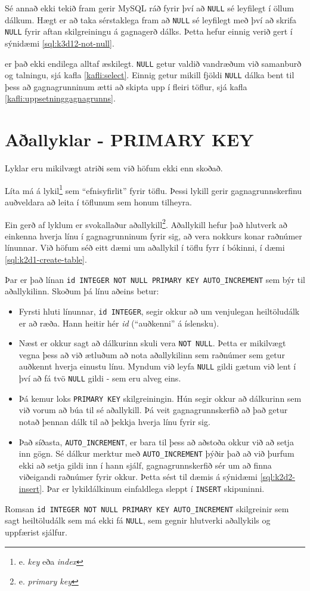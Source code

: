 Sé annað ekki tekið fram gerir MySQL ráð fyrir því að \verb|NULL| sé leyfilegt í öllum dálkum. Hægt er að taka sérstaklega fram að \verb|NULL| sé leyfilegt með því að skrifa \verb|NULL| fyrir aftan skilgreiningu á gagnagerð dálks. Þetta hefur einnig verið gert í sýnidæmi \ref{sql:k3d12-not-null}.

 er það ekki endilega alltaf æskilegt. \verb|NULL| getur valdið vandræðum við samanburð og talningu, sjá kafla \ref{kafli:select}. Einnig getur mikill fjöldi \verb|NULL| dálka bent til þess að gagnagrunninum ætti að skipta upp í fleiri töflur, sjá kafla \ref{kafli:uppsetninggagnagrunns}.

\section{Aðallyklar - PRIMARY KEY} %
\label{undirkafli:adallyklar-kynning}
Lyklar eru mikilvægt atriði sem við höfum ekki enn skoðað.

Líta má á lykil\footnote{e. \emph{key} eða \emph{index}} sem ``efnisyfirlit'' fyrir töflu. Þessi lykill gerir gagnagrunnskerfinu auðveldara að leita í töflunum sem honum tilheyra.

Ein gerð af lyklum er svokallaður aðallykill\footnote{e. \emph{primary key}}. Aðallykill hefur það hlutverk að einkenna hverja línu í gagnagrunninum fyrir sig, að vera nokkurs konar raðnúmer línunnar. Við höfum séð eitt dæmi um aðallykil í töflu fyrr í bókinni, í dæmi \ref{sql:k2d1-create-table}.

Þar er það línan \verb|id INTEGER NOT NULL PRIMARY KEY AUTO_INCREMENT| sem býr til aðallykilinn. Skoðum þá línu aðeins betur:

\begin{itemize}
 \item Fyrsti hluti línunnar, \verb|id INTEGER|, segir okkur að um venjulegan heiltöludálk er að ræða. Hann heitir hér \emph{id} (``auðkenni'' á íslensku). 
 \item Næst er okkur sagt að dálkurinn skuli vera \verb|NOT NULL|. Þetta er mikilvægt vegna þess að við ætluðum að nota aðallykilinn sem raðnúmer sem getur auðkennt hverja einustu línu. Myndum við leyfa \verb|NULL| gildi gætum við lent í því að fá tvö \verb|NULL| gildi - sem eru alveg eins.
 \item Þá kemur loks \verb|PRIMARY KEY| skilgreiningin. Hún segir okkur að dálkurinn sem við vorum að búa til sé aðallykill. Þá veit gagnagrunnskerfið að það getur notað þennan dálk til að þekkja hverja línu fyrir sig.
 \item Það síðasta, \verb|AUTO_INCREMENT|, er bara til þess að aðstoða okkur við að setja inn gögn. Sé dálkur merktur með \verb|AUTO_INCREMENT| þýðir það að við þurfum ekki að setja gildi inn í hann sjálf, gagnagrunnskerfið sér um að finna viðeigandi raðnúmer fyrir okkur. Þetta sést til dæmis á sýnidæmi \ref{sql:k2d2-insert}. Þar er lykildálkinum einfaldlega sleppt í \verb|INSERT| skipuninni.
\end{itemize} 
Romsan \verb|id INTEGER NOT NULL PRIMARY KEY AUTO_INCREMENT| skilgreinir sem sagt heiltöludálk sem má ekki fá \verb|NULL|, sem gegnir hlutverki aðallykils og uppfærist sjálfur.

